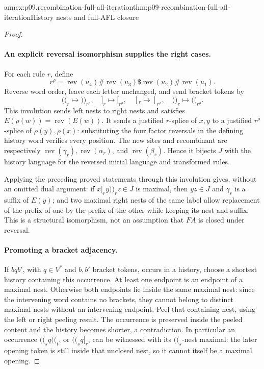 \begin{annexitem}{annex:p09.recombination-full-afl-iteration}{thm:p09-recombination-full-afl-iteration}{History nests and full-AFL closure}
\begin{proof}
\paragraph{An explicit reversal isomorphism supplies the right cases.}
For each rule \(r\), define
\[
 r^\rho=\operatorname{rev}(u_4)\#
         \operatorname{rev}(u_3)\$
         \operatorname{rev}(u_2)\#
         \operatorname{rev}(u_1).
\]
Reverse word order, leave each letter unchanged, and send bracket tokens by
\[
 \mathopen{(\!(}_r\mapsto \mathclose{)\!)}_{r^\rho},\quad ]_r\mapsto [_{r^\rho},\quad
 [_r\mapsto ]_{r^\rho},\quad \mathclose{)\!)}_r\mapsto \mathopen{(\!(}_{r^\rho}.
\]
This involution sends left nests to right nests and satisfies
\(E(\rho(w))=\operatorname{rev}(E(w))\).
It sends a justified \(r\)-splice of \(x,y\) to a justified
\(r^\rho\)-splice of \(\rho(y),\rho(x)\): substituting the four
factor reversals in the defining history word verifies every position.
The new sites and recombinant are respectively
\(\operatorname{rev}(\gamma_r),\operatorname{rev}(\alpha_r)\),
and \(\operatorname{rev}(\beta_r)\).
Hence it bijects \(J\) with the history language for the reversed initial
language and transformed rules.

Applying the preceding proved statements through this involution gives,
without an omitted dual argument:
if \(x[_ry\mathclose{)\!)}_rz\in J\) is maximal, then \(yz\in J\) and
\(\gamma_r\) is a suffix of \(E(y)\);
and two maximal right nests of the same label allow replacement of the
prefix of one by the prefix of the other while keeping its nest and suffix.
This is a structural isomorphism, not an assumption that \(FA\) is closed
under reversal.

\paragraph{Promoting a bracket adjacency.}
If \(bqb'\), with \(q\in V^*\) and \(b,b'\) bracket tokens, occurs in
a history, choose a shortest history containing this occurrence.
At least one endpoint is an endpoint of a maximal nest.
Otherwise both endpoints lie inside the same maximal nest: since the
intervening word contains no brackets, they cannot belong to distinct
maximal nests without an intervening endpoint. Peel that containing nest,
using the left or right peeling result. The occurrence is preserved inside
the peeled content and the history becomes shorter, a contradiction.
In particular an occurrence \(\mathopen{(\!(}_sq\mathopen{(\!(}_t\), or \(\mathopen{(\!(}_sq[_r\), can be witnessed
with its \(\mathopen{(\!(}_s\)-nest maximal: the later opening token is still inside
that unclosed nest, so it cannot itself be a maximal opening.


\end{proof}
\end{annexitem}
